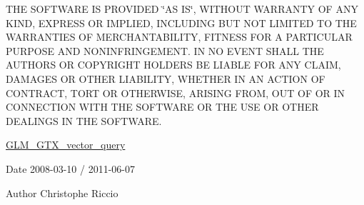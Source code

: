 T\-H\-E S\-O\-F\-T\-W\-A\-R\-E I\-S P\-R\-O\-V\-I\-D\-E\-D \char`\"{}\-A\-S I\-S\char`\"{}, W\-I\-T\-H\-O\-U\-T W\-A\-R\-R\-A\-N\-T\-Y O\-F A\-N\-Y K\-I\-N\-D, E\-X\-P\-R\-E\-S\-S O\-R I\-M\-P\-L\-I\-E\-D, I\-N\-C\-L\-U\-D\-I\-N\-G B\-U\-T N\-O\-T L\-I\-M\-I\-T\-E\-D T\-O T\-H\-E W\-A\-R\-R\-A\-N\-T\-I\-E\-S O\-F M\-E\-R\-C\-H\-A\-N\-T\-A\-B\-I\-L\-I\-T\-Y, F\-I\-T\-N\-E\-S\-S F\-O\-R A P\-A\-R\-T\-I\-C\-U\-L\-A\-R P\-U\-R\-P\-O\-S\-E A\-N\-D N\-O\-N\-I\-N\-F\-R\-I\-N\-G\-E\-M\-E\-N\-T. I\-N N\-O E\-V\-E\-N\-T S\-H\-A\-L\-L T\-H\-E A\-U\-T\-H\-O\-R\-S O\-R C\-O\-P\-Y\-R\-I\-G\-H\-T H\-O\-L\-D\-E\-R\-S B\-E L\-I\-A\-B\-L\-E F\-O\-R A\-N\-Y C\-L\-A\-I\-M, D\-A\-M\-A\-G\-E\-S O\-R O\-T\-H\-E\-R L\-I\-A\-B\-I\-L\-I\-T\-Y, W\-H\-E\-T\-H\-E\-R I\-N A\-N A\-C\-T\-I\-O\-N O\-F C\-O\-N\-T\-R\-A\-C\-T, T\-O\-R\-T O\-R O\-T\-H\-E\-R\-W\-I\-S\-E, A\-R\-I\-S\-I\-N\-G F\-R\-O\-M, O\-U\-T O\-F O\-R I\-N C\-O\-N\-N\-E\-C\-T\-I\-O\-N W\-I\-T\-H T\-H\-E S\-O\-F\-T\-W\-A\-R\-E O\-R T\-H\-E U\-S\-E O\-R O\-T\-H\-E\-R D\-E\-A\-L\-I\-N\-G\-S I\-N T\-H\-E S\-O\-F\-T\-W\-A\-R\-E.

\hyperlink{group__gtx__vector__query}{G\-L\-M\-\_\-\-G\-T\-X\-\_\-vector\-\_\-query}

\begin{DoxyDate}{Date}
2008-\/03-\/10 / 2011-\/06-\/07 
\end{DoxyDate}
\begin{DoxyAuthor}{Author}
Christophe Riccio 
\end{DoxyAuthor}
